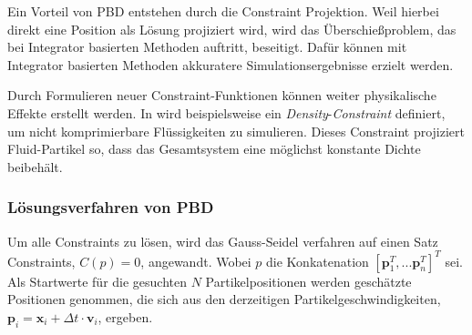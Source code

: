 Ein Vorteil von PBD entstehen durch die Constraint Projektion. 
Weil hierbei direkt eine Position als Lösung projiziert wird,
wird das Überschießproblem, das bei Integrator basierten Methoden 
auftritt, beseitigt. 
Dafür können mit Integrator basierten Methoden akkuratere Simulationsergebnisse erzielt werden.

Durch Formulieren neuer Constraint-Funktionen können weiter physikalische Effekte erstellt werden. In \cite{UPP} wird beispielsweise ein \newline \textit{Density}-\textit{Constraint} definiert, um nicht komprimierbare Flüssigkeiten zu simulieren. Dieses Constraint projiziert Fluid-Partikel so, dass das Gesamtsystem eine möglichst konstante Dichte beibehält.



\subsubsection{Lösungsverfahren von PBD}

Um alle Constraints zu lösen, wird das Gauss-Seidel verfahren auf einen Satz Constraints, $C(p)=0$, angewandt. Wobei $p$ die Konkatenation $[\textbf{p}_1^T,...\textbf{p}_n^T]^T$ sei.
Als Startwerte für die gesuchten $N$ Partikelpositionen werden geschätzte Positionen genommen, die sich aus den derzeitigen Partikelgeschwindigkeiten, $\textbf{p}_i = \textbf{x}_i + \Delta t \cdot \textbf{v}_i$, ergeben. 

